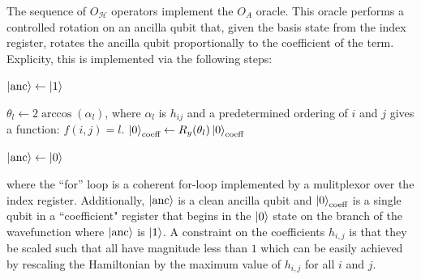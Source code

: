 The sequence of $O_\mathcal{H}$ operators implement the $O_A$ oracle.
This oracle performs a controlled rotation on an ancilla qubit that, given the basis state from the index register, rotates the ancilla qubit proportionally to the coefficient of the term.
Explicity, this is implemented via the following steps:
\begin{algorithmic}[1]
            \State $\ket{\text{anc}} \gets \ket{1}$
        \EndIf

            \State $\theta_l \gets 2\arccos(\alpha_l)$, where $\alpha_l$ is $h_{ij}$ and a predetermined ordering of $i$ and $j$ gives a function: $f(i, j) = l$.
            \State $\ket{0}_{\text{coeff}} \gets R_y(\theta_l) \ket{0}_{\text{coeff}}$ 
        \EndIf

        \State $\ket{\text{anc}} \gets \ket{0}$
    \EndFor
\end{algorithmic}
where the ``for'' loop is a coherent for-loop implemented by a mulitplexor over the index register.
Additionally, $\ket{\text{anc}}$ is a clean ancilla qubit and $\ket{0}_{\text{coeff}}$ is a single qubit in a ``coefficient" register that begins in the $\ket{0}$ state on the branch of the wavefunction where $\ket{\text{anc}}$ is $\ket{1}$. 
A constraint on the coefficients $h_{i, j}$ is that they be scaled such that all have magnitude less than $1$ which can be easily achieved by rescaling the Hamiltonian by the maximum value of $h_{i, j}$ for all $i$ and $j$.


